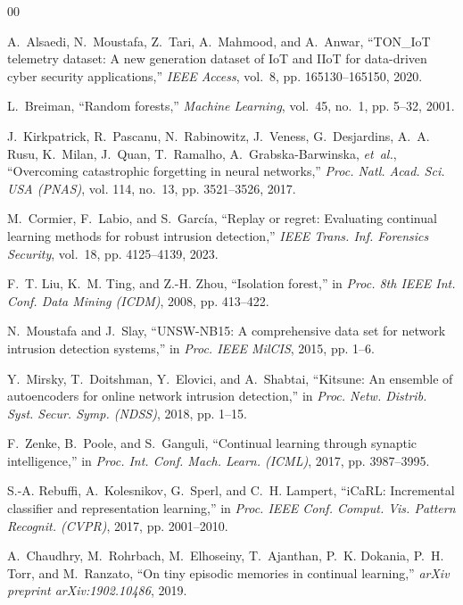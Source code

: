 \documentclass[conference]{IEEEtran}
\begin{document}
\begin{thebibliography}{00}

A.~Alsaedi, N.~Moustafa, Z.~Tari, A.~Mahmood, and A.~Anwar, ``TON\_IoT telemetry dataset: A new generation dataset of IoT and IIoT for data-driven cyber security applications,'' \emph{IEEE Access}, vol.~8, pp. 165130--165150, 2020.

L.~Breiman, ``Random forests,'' \emph{Machine Learning}, vol.~45, no.~1, pp. 5--32, 2001.

J.~Kirkpatrick, R.~Pascanu, N.~Rabinowitz, J.~Veness, G.~Desjardins, A.~A. Rusu, K.~Milan, J.~Quan, T.~Ramalho, A.~Grabska-Barwinska, \emph{et~al.}, ``Overcoming catastrophic forgetting in neural networks,'' \emph{Proc. Natl. Acad. Sci. USA (PNAS)}, vol. 114, no.~13, pp. 3521--3526, 2017.

M.~Cormier, F.~Labio, and S.~Garc{\'i}a, ``Replay or regret: Evaluating continual learning methods for robust intrusion detection,'' \emph{IEEE Trans. Inf. Forensics Security}, vol.~18, pp. 4125--4139, 2023.

F.~T. Liu, K.~M. Ting, and Z.-H. Zhou, ``Isolation forest,'' in \emph{Proc. 8th IEEE Int. Conf. Data Mining (ICDM)}, 2008, pp. 413--422.

N.~Moustafa and J.~Slay, ``UNSW-NB15: A comprehensive data set for network intrusion detection systems,'' in \emph{Proc. IEEE MilCIS}, 2015, pp. 1--6.

Y.~Mirsky, T.~Doitshman, Y.~Elovici, and A.~Shabtai, ``Kitsune: An ensemble of autoencoders for online network intrusion detection,'' in \emph{Proc. Netw. Distrib. Syst. Secur. Symp. (NDSS)}, 2018, pp. 1--15.

F.~Zenke, B.~Poole, and S.~Ganguli, ``Continual learning through synaptic intelligence,'' in \emph{Proc. Int. Conf. Mach. Learn. (ICML)}, 2017, pp. 3987--3995.

S.-A. Rebuffi, A.~Kolesnikov, G.~Sperl, and C.~H. Lampert, ``iCaRL: Incremental classifier and representation learning,'' in \emph{Proc. IEEE Conf. Comput. Vis. Pattern Recognit. (CVPR)}, 2017, pp. 2001--2010.

A.~Chaudhry, M.~Rohrbach, M.~Elhoseiny, T.~Ajanthan, P.~K. Dokania, P.~H. Torr, and M.~Ranzato, ``On tiny episodic memories in continual learning,'' \emph{arXiv preprint arXiv:1902.10486}, 2019.


\end{thebibliography}
\end{document}
